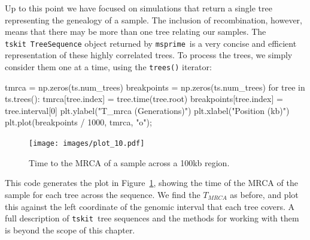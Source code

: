 \documentclass[graybox]{svmult}
\newcommand{\msprime}[0]{\texttt{msprime}}
\newcommand{\tskit}[0]{\texttt{tskit}}
\begin{document}
Up to this point we have focused on simulations that return a single
tree representing the genealogy of a sample. The inclusion of
recombination, however, means that there may be more than one tree
relating our samples. The \tskit\ \texttt{TreeSequence} object returned by
\msprime\ is a very concise and efficient representation of these highly
correlated trees. To process the trees, we simply consider
them one at a time, using the \texttt{trees()} iterator:

\begin{pythoncode}
tmrca = np.zeros(ts.num_trees)
breakpoints = np.zeros(ts.num_trees)
for tree in ts.trees():
    tmrca[tree.index] = tree.time(tree.root)
    breakpoints[tree.index] = tree.interval[0]
plt.ylabel("T_mrca (Generations)")
plt.xlabel("Position (kb)")
plt.plot(breakpoints / 1000, tmrca, "o");
\end{pythoncode}

\begin{figure}
\begin{center}
\texttt{[image: images/plot\_10.pdf]}
\end{center}
\caption{\label{fig:tree_tmrcas}Time to the MRCA of
a sample across a 100kb region.}
\end{figure}

This code generates the plot in Figure~\ref{fig:tree_tmrcas}, showing the time of the MRCA of the sample for each tree across the
sequence. We find the \(T_{MRCA}\) as before, and plot this against the
left coordinate of the genomic interval that each tree covers. A full description of
\tskit\ tree sequences and the methods for working with them is
beyond the scope of this chapter.



\end{document}
